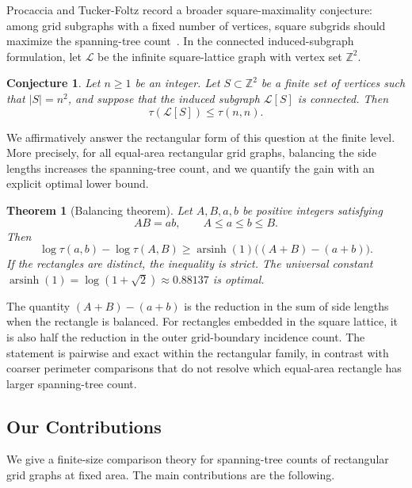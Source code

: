 \documentclass[11pt]{article}
\numberwithin{equation}{section}
\newtheorem{theorem}{Theorem}[section]
\newtheorem{conjecture}[conjecture]{Conjecture}
\DeclareMathOperator{\arsinh}{arsinh}
\newcommand{\Z}{\mathbb{Z}}
\begin{document}
Procaccia and Tucker-Foltz record a broader square-maximality conjecture: among grid subgraphs with a fixed number of vertices, square subgrids should maximize the spanning-tree count~\cite{ProcacciaTuckerFoltz2022}. In the connected induced-subgraph formulation, let $\mathcal L$ be the infinite square-lattice graph with vertex set $\Z^2$.

\begin{conjecture}\label{conj:induced-grid}
Let $n\ge 1$ be an integer. Let $S\subset\Z^2$ be a finite set of vertices such that $|S|=n^2$, and suppose that the induced subgraph $\mathcal L[S]$ is connected. Then
\[
  \tau(\mathcal L[S])\le \tau(n,n).
\]
\end{conjecture}

We affirmatively answer the rectangular form of this question at the finite level. More precisely, for all equal-area rectangular grid graphs, balancing the side lengths increases the spanning-tree count, and we quantify the gain with an explicit optimal lower bound.

\begin{theorem}[Balancing theorem]\label{thm:balancing}
Let $A,B,a,b$ be positive integers satisfying
\[
  AB=ab,\qquad A\le a\le b\le B.
\]
Then
\[
  \log\tau(a,b)-\log\tau(A,B)
  \ge
  \arsinh(1)\bigl((A+B)-(a+b)\bigr).
\]
If the rectangles are distinct, the inequality is strict. The universal constant $\arsinh(1)=\log(1+\sqrt2)\approx0.88137$ is optimal.
\end{theorem}

The quantity $(A+B)-(a+b)$ is the reduction in the sum of side lengths when the rectangle is balanced. For rectangles embedded in the square lattice, it is also half the reduction in the outer grid-boundary incidence count. The statement is pairwise and exact within the rectangular family, in contrast with coarser perimeter comparisons that do not resolve which equal-area rectangle has larger spanning-tree count.

\subsection{Our Contributions}

We give a finite-size comparison theory for spanning-tree counts of rectangular grid graphs at fixed area. The main contributions are the following.
\end{document}

